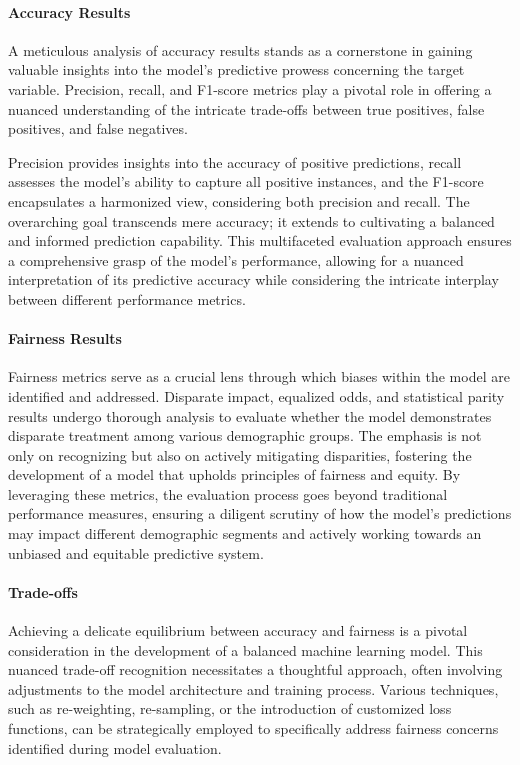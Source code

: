 \paragraph{Accuracy Results}

A meticulous analysis of accuracy results stands as a cornerstone in gaining valuable insights into the model's predictive prowess concerning the target variable. Precision, recall, and F1-score metrics play a pivotal role in offering a nuanced understanding of the intricate trade-offs between true positives, false positives, and false negatives.

Precision provides insights into the accuracy of positive predictions, recall assesses the model's ability to capture all positive instances, and the F1-score encapsulates a harmonized view, considering both precision and recall. The overarching goal transcends mere accuracy; it extends to cultivating a balanced and informed prediction capability. This multifaceted evaluation approach ensures a comprehensive grasp of the model's performance, allowing for a nuanced interpretation of its predictive accuracy while considering the intricate interplay between different performance metrics.

\paragraph{Fairness Results}

Fairness metrics serve as a crucial lens through which biases within the model are identified and addressed. Disparate impact, equalized odds, and statistical parity results undergo thorough analysis to evaluate whether the model demonstrates disparate treatment among various demographic groups. The emphasis is not only on recognizing but also on actively mitigating disparities, fostering the development of a model that upholds principles of fairness and equity. By leveraging these metrics, the evaluation process goes beyond traditional performance measures, ensuring a diligent scrutiny of how the model's predictions may impact different demographic segments and actively working towards an unbiased and equitable predictive system.

\paragraph{Trade-offs}

Achieving a delicate equilibrium between accuracy and fairness is a pivotal consideration in the development of a balanced machine learning model. This nuanced trade-off recognition necessitates a thoughtful approach, often involving adjustments to the model architecture and training process. Various techniques, such as re-weighting, re-sampling, or the introduction of customized loss functions, can be strategically employed to specifically address fairness concerns identified during model evaluation.

